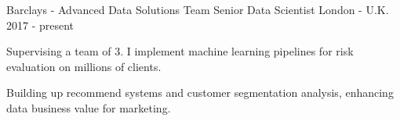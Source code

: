 


\begin{cventries}




\cventry
{Barclays - Advanced Data Solutions Team} %
{Senior Data Scientist} %
{London - U.K.} %
{2017 - present} %
{ %
\begin{cvitems}
\item {Supervising a team of 3. I implement machine learning pipelines for risk evaluation on millions of clients.}
\item {Building up recommend systems and customer segmentation analysis, enhancing data business value for marketing.}
\end{cvitems}
}



\end{cventries}
